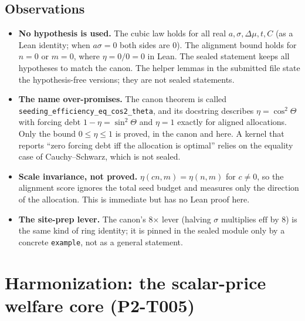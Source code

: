 \documentclass[11pt]{article}
\theoremstyle{definition}
\theoremstyle{remark}
\begin{document}
\subsection{Observations}
\begin{itemize}
\item \textbf{No hypothesis is used.} The cubic law holds for all real $a,\sigma,\Delta\mu,t,C$ (as a Lean identity; when
$a\sigma=0$ both sides are $0$). The alignment bound holds for $n=0$ or $m=0$, where $\eta=0/0=0$ in Lean.
The sealed statement keeps all hypotheses to match the canon. The helper lemmas in the submitted file state the
hypothesis-free versions; they are not sealed statements.
\item \textbf{The name over-promises.} The canon theorem is called \texttt{seeding\_efficiency\_eq\_cos2\_theta}, and its
docstring describes $\eta=\cos^2\Theta$ with forcing debt $1-\eta=\sin^2\Theta$ and $\eta=1$ exactly for aligned allocations.
Only the bound $0\le\eta\le1$ is proved, in the canon and here. A kernel that reports ``zero forcing debt iff the allocation
is optimal'' relies on the equality case of Cauchy--Schwarz, which is not sealed.
\item \textbf{Scale invariance, not proved.} $\eta(cn,m)=\eta(n,m)$ for $c\ne0$, so the alignment score ignores the total
seed budget and measures only the direction of the allocation. This is immediate but has no Lean proof here.
\item \textbf{The site-prep lever.} The canon's 8$\times$ lever (halving $\sigma$ multiplies $\mathrm{eff}$ by $8$) is the same
kind of ring identity; it is pinned in the sealed module only by a concrete \texttt{example}, not as a general statement.
\end{itemize}

\section{Harmonization: the scalar-price welfare core (P2-T005)}\label{sec:harmonization}
\end{document}
